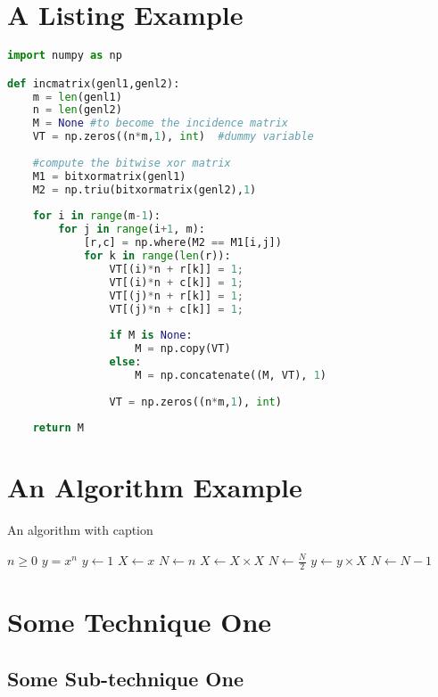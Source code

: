 \blindtext

\pagebreak
\section{A Listing Example}

\begin{lstlisting}[language=Python,caption={My Listing Caption},captionpos=b]
import numpy as np

def incmatrix(genl1,genl2):
	m = len(genl1)
	n = len(genl2)
	M = None #to become the incidence matrix
	VT = np.zeros((n*m,1), int)  #dummy variable
	
	#compute the bitwise xor matrix
	M1 = bitxormatrix(genl1)
	M2 = np.triu(bitxormatrix(genl2),1) 
	
	for i in range(m-1):
		for j in range(i+1, m):
			[r,c] = np.where(M2 == M1[i,j])
			for k in range(len(r)):
				VT[(i)*n + r[k]] = 1;
				VT[(i)*n + c[k]] = 1;
				VT[(j)*n + r[k]] = 1;
				VT[(j)*n + c[k]] = 1;
	
				if M is None:
					M = np.copy(VT)
				else:
					M = np.concatenate((M, VT), 1)
				
				VT = np.zeros((n*m,1), int)
	
	return M
\end{lstlisting}

\blindtext

\section{An Algorithm Example}

\begin{algorithm}
	\caption{An algorithm with caption}\label{alg:cap}
	\begin{algorithmic}
		\Require $n \geq 0$
		\Ensure $y = x^n$
		\State $y \gets 1$
		\State $X \gets x$
		\State $N \gets n$
		\State $X \gets X \times X$
		\State $N \gets \frac{N}{2}$  
		\State $y \gets y \times X$
		\State $N \gets N - 1$
		\EndIf
		\EndWhile
	\end{algorithmic}
\end{algorithm}

\blindtext

\section{Some Technique One}
\blindtext
\subsection{Some Sub-technique One}
\blindtext
{}
\blindtext
